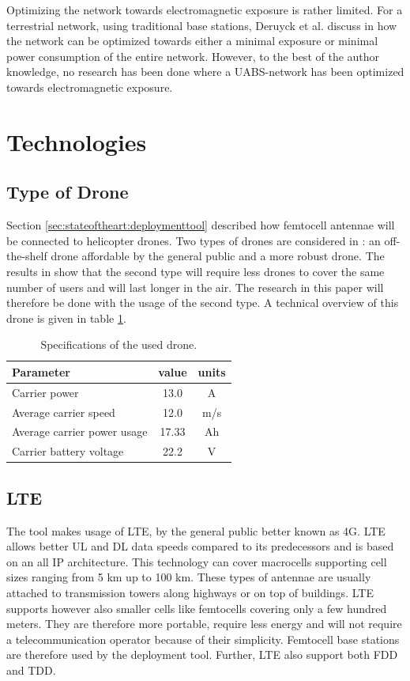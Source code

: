 Optimizing the network towards electromagnetic exposure is rather limited. For a terrestrial network, using traditional base stations,
Deruyck et al. discuss in \cite{J1} how the network can be optimized towards either a minimal exposure or minimal power consumption of the entire network.
However, to the best of the author knowledge, no research has been done where a \gls{UABS}-network has been optimized towards electromagnetic exposure.

\section{Technologies}
\subsection{Type of Drone}
\label{sec:typeofdrone}

Section \ref{sec:stateoftheart:deploymenttool} described how femtocell antennae will be connected to helicopter drones. Two types of 
drones are considered in \cite{J2}: an off-the-shelf drone affordable by the general public and a more robust drone. The results in \cite{J2}
show that the second type will require less drones to cover the same number of users and will last longer in the air. The research in this paper
will therefore be done with the usage of the second type. A technical overview of this drone is given in table \ref{table:dronespecs}.

\begin{table}[h!]
\centering
\begin{tabular}{|l|c|c|}
\hline
 Parameter          & value      & units   \\    \hline
 Carrier power      & 13.0 &A \\
 Average carrier speed           & 12.0 &m/s       \\ 
 Average carrier power usage    & 17.33& Ah      \\ 
 Carrier battery voltage        & 22.2 &V \\ \hline
\end{tabular}
\caption{Specifications of the used drone.}
\label{table:dronespecs}
\end{table}

\subsection{LTE}
The tool makes usage of \gls{LTE}, by the general public better known as 4G.  \gls{LTE} allows better \gls{UL} and \gls{DL} data speeds 
compared to its predecessors and is based on an all IP architecture. This technology can cover macrocells supporting cell sizes ranging from 5 km up to 100 km. 
These types of antennae are usually attached to transmission towers along highways or on top of buildings. LTE supports however also smaller cells like
femtocells covering only a few hundred meters. They are therefore more portable, require less energy and will not require a telecommunication operator because
of their simplicity. Femtocell base stations are therefore used by the deployment tool.
Further, \gls{LTE} also support both \gls{FDD} and \gls{TDD}.

